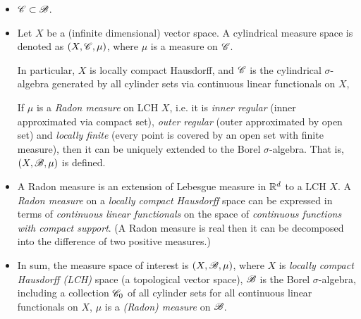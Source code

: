 \documentclass[11pt]{article}
\begin{document}
\begin{itemize}
\item ${\mathscr C} \subset {\mathscr B}$. \\

\item Let $X$ be a (infinite dimensional) vector space. A cylindrical measure space is denoted as $(X, {\mathscr C}, \mu)$, where $\mu$ is a measure on ${\mathscr C}$.

In particular, $X$ is locally compact Hausdorff, and ${\mathscr C}$ is the cylindrical  $\sigma$-algebra generated by all cylinder sets via continuous linear functionals on $X$, 

If $\mu$ is a \emph{Radon measure} on LCH $X$, i.e. it is \emph{inner regular} (inner approximated via compact set), \emph{outer regular} (outer approximated by open set) and \emph{locally finite} (every point is covered by an open set with finite measure), then it can be uniquely extended to the Borel $\sigma$-algebra. That is, $(X, {\mathscr B}, \mu)$ is defined. \citep{lifshits2013gaussian}\\

\item \citep{folland2013real} 
A Radon measure is an extension of Lebesgue measure in ${\mathbb R}^{d}$ to a LCH $X$.  A \emph{Radon measure} on a \emph{locally compact Hausdorff} space can be expressed in terms of \emph{continuous linear functionals} on the space of \emph{continuous functions with compact support}. (A Radon measure is real then it can be decomposed into the difference of two positive measures.)\\[10pt]

\item In sum, the measure space of interest is $(X, {\mathscr B}, \mu)$, where $X$ is \emph{locally compact Hausdorff (LCH)} space (a topological vector space), ${\mathscr B}$ is the Borel $\sigma$-algebra, including a collection ${\mathscr C}_{0}$ of all cylinder sets for all continuous linear functionals on $X$, $\mu$ is a \emph{(Radon) measure} on ${\mathscr B}$. 
\end{itemize}
\end{document}
